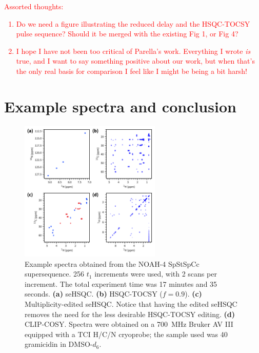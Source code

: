 \documentclass[11pt]{article}
\newcommand*{\carbon}{\ce{^{13}C}}
\newcommand*{\nitrogen}{\ce{^{15}N}}
\newcommand*{\red}[1]{\textcolor{red}{#1}}
\newcommand*{\grami}{Spectra were obtained on a \SI{700}{\MHz} Bruker AV III equipped with a TCI H/C/N cryoprobe; the sample used was \SI{40}{\milli\molar} gramicidin in DMSO-$d_6$.}
\begin{document}
\red{
    Assorted thoughts:
    \begin{enumerate}
        \item Do we need a figure illustrating the reduced delay and the HSQC-TOCSY pulse sequence? Should it be merged with the existing Fig 1, or Fig 4?
        \item I hope I have not been too critical of Parella's work. Everything I wrote \textit{is} true, and I want to say something positive about our work, but when that's the only real basis for comparison I feel like I might be being a bit harsh!
    \end{enumerate}
}

\section*{Example spectra and conclusion}

\begin{figure}
    \centering
    \includegraphics[width=0.6\textwidth]{figures/spstspcc.png}
    \caption{
        Example spectra obtained from the NOAH-4 SpStSpCc supersequence.
        256 $t_1$ increments were used, with 2 scans per increment.
        The total experiment time was 17 minutes and 35 seconds.
        \textbf{(a)} \nitrogen{} seHSQC.
        \textbf{(b)} \carbon{} HSQC-TOCSY ($f = 0.9$).
        \textbf{(c)} Multiplicity-edited \carbon{} seHSQC. Notice that having the edited seHSQC removes the need for the less desirable HSQC-TOCSY editing.
        \textbf{(d)} CLIP-COSY.
        \grami{}
    }
    \label{fig:example_spec}
\end{figure}
\end{document}
